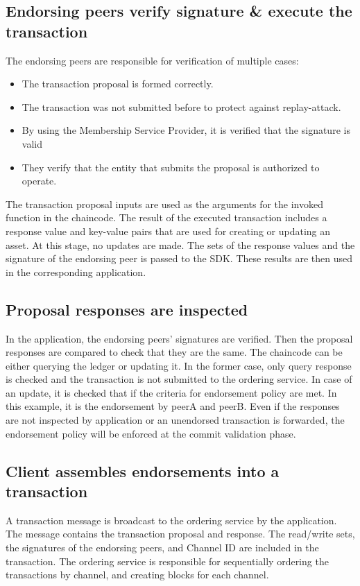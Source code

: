\documentclass[sigconf,natbib=false]{acmart}
\begin{document}
    \subsection{Endorsing peers verify signature \& execute the transaction}
    The endorsing peers are responsible for verification of multiple cases:
    \begin{itemize}
        \item The transaction proposal is formed correctly.
        \item The transaction was not submitted before to protect against replay-attack.
        \item By using the Membership Service Provider, it is verified that the signature is valid
        \item They verify that the entity that submits the proposal is authorized to operate.
    \end{itemize}
    The transaction proposal inputs are used as the arguments for the invoked function in the chaincode. The result of the executed transaction includes a response value and key-value pairs that are used for creating or updating an asset. At this stage, no updates are made. The sets of the response values and the signature of the endorsing peer is passed to the SDK. These results are then used in the corresponding application.
    \subsection{Proposal responses are inspected}
    In the application, the endorsing peers' signatures are verified. Then the proposal responses are compared to check that they are the same. The chaincode can be either querying the ledger or updating it. In the former case, only query response is checked and the transaction is not submitted to the ordering service. In case of an update, it is checked that if the criteria for endorsement policy are met. In this example, it is the endorsement by peerA and peerB. Even if the responses are not inspected by application or an unendorsed transaction is forwarded, the endorsement policy will be enforced at the commit validation phase.
    \subsection{Client assembles endorsements into a transaction}
    A transaction message is broadcast to the ordering service by the application. The message contains the transaction proposal and response. The read/write sets, the signatures of the endorsing peers, and Channel ID are included in the transaction. The ordering service is responsible for sequentially ordering the transactions by channel, and creating blocks for each channel.
\end{document}

